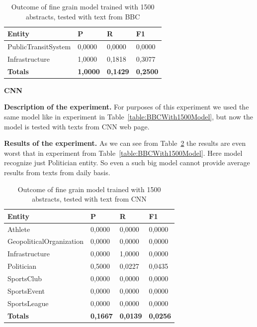 \documentclass[thesis=M,english]{FITthesis}[2018/05/30]
\begin{document}
	\begin{table}[H]\centering
	\begin{tabular}{|l|l|l|l|}
		\hline {\textbf{Entity}} & {\textbf{P}} & {\textbf{R}} & {\textbf{F1}}\\\hline
   		PublicTransitSystem & 0,0000 & 0,0000 & 0,0000\\
   		Infrastructure &  1,0000 & 0,1818 & 0,3077	\\\hline  
		\textbf{Totals} & \textbf{1,0000} & \textbf{0,1429} & \textbf{0,2500}\\\hline
	\end{tabular}			
		\caption{Outcome of fine grain model trained with 1500 abstracts, tested with text from BBC\label{table:BBCTransportationWith500TransportationModel}}
	\end{table}
	
	
	
	
	\textbf{CNN}

\textbf{Description of the experiment.} For purposes of this experiment we used the same model like in experiment in Table~\ref{table:BBCWith1500Model}, but now the model is tested with texts from CNN web page.

\textbf{Results of the experiment.} As we can see from Table~\ref{table:CNNWith1500Model} the results are even worst that in experiment from Table~\ref{table:BBCWith1500Model}. Here model recognize just Politician entity. So even a such big model cannot provide average results from texts from daily basis.

\begin{table}[H]\centering
	\begin{tabular}{|l|l|l|l|}
		\hline {\textbf{Entity}} & {\textbf{P}} & {\textbf{R}} & {\textbf{F1}}\\\hline
        Athlete & 0,0000 & 0,0000 & 0,0000\\
 		GeopoliticalOrganization & 0,0000 & 0,0000 & 0,0000\\
 		Infrastructure & 0,0000 & 1,0000 & 0,0000\\
     	Politician & 0,5000 & 0,0227 & 0,0435\\
		SportsClub & 0,0000 & 0,0000 & 0,0000\\
    	SportsEvent & 0,0000 & 0,0000 & 0,0000\\
   		SportsLeague & 0,0000 & 0,0000 & 0,0000\\\hline  
		\textbf{Totals} & \textbf{0,1667} & \textbf{0,0139} & \textbf{0,0256}\\\hline
	\end{tabular}			
		\caption{Outcome of fine grain model trained with 1500 abstracts, tested with text from CNN\label{table:CNNWith1500Model}}
	\end{table}	
	
\end{document}
